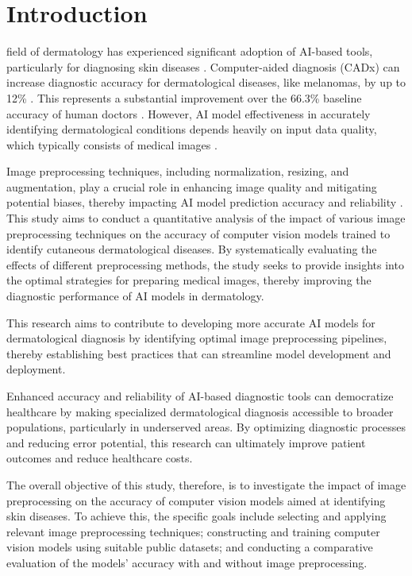 \documentclass[journal]{IEEEtran}
\begin{document}

\section{Introduction}
 field of dermatology has experienced significant adoption of AI-based tools, particularly for diagnosing skin diseases \cite{Krakowski2024}. Computer-aided diagnosis (CADx) can increase diagnostic accuracy for dermatological diseases, like melanomas, by up to 12\% \cite{10.1001/jamanetworkopen.2021.7249, Brinker2019}. This represents a substantial improvement over the 66.3\% baseline accuracy of human doctors \cite{Barnett2019}. However, AI model effectiveness in accurately identifying dermatological conditions depends heavily on input data quality, which typically consists of medical images \cite{ALHINAI20201, Brinker2019}.

Image preprocessing techniques, including normalization, resizing, and augmentation, play a crucial role in enhancing image quality and mitigating potential biases, thereby impacting AI model prediction accuracy and reliability \cite{RODRIGUES2020103542, 9548351, Tarawneh2024}. This study aims to conduct a quantitative analysis of the impact of various image preprocessing techniques on the accuracy of computer vision models trained to identify cutaneous dermatological diseases. By systematically evaluating the effects of different preprocessing methods, the study seeks to provide insights into the optimal strategies for preparing medical images, thereby improving the diagnostic performance of AI models in dermatology.

This research aims to contribute to developing more accurate AI models for dermatological diagnosis by identifying optimal image preprocessing pipelines, thereby establishing best practices that can streamline model development and deployment.

Enhanced accuracy and reliability of AI-based diagnostic tools can democratize healthcare by making specialized dermatological diagnosis accessible to broader populations, particularly in underserved areas. By optimizing diagnostic processes and reducing error potential, this research can ultimately improve patient outcomes and reduce healthcare costs.

The overall objective of this study, therefore, is to investigate the impact of image preprocessing on the accuracy of computer vision models aimed at identifying skin diseases. To achieve this, the specific goals include selecting and applying relevant image preprocessing techniques; constructing and training computer vision models using suitable public datasets; and conducting a comparative evaluation of the models' accuracy with and without image preprocessing.
\end{document}

